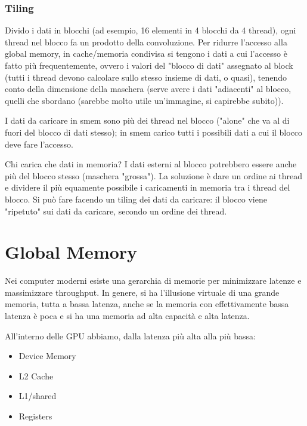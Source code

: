 
\subsubsection{Tiling}
Divido i dati in blocchi (ad esempio, 16 elementi in 4 blocchi da 4 thread), ogni thread nel blocco fa un prodotto della convoluzione. Per ridurre l'accesso alla global memory, in cache/memoria condivisa si tengono i dati a cui l'accesso è fatto più frequentemente, ovvero i valori del "blocco di dati" assegnato al block (tutti i thread devono calcolare sullo stesso insieme di dati, o quasi), tenendo conto della dimensione della maschera (serve avere i dati "adiacenti" al blocco, quelli che sbordano (sarebbe molto utile un'immagine, si capirebbe subito)).

I dati da caricare in smem sono più dei thread nel blocco ("alone" che va al di fuori del blocco di dati stesso); in smem carico tutti i possibili dati a cui il blocco deve fare l'accesso. 

Chi carica che dati in memoria? I dati esterni al blocco potrebbero essere anche più del blocco stesso (maschera "grossa"). La soluzione è dare un ordine ai thread e dividere il più equamente possibile i caricamenti in memoria tra i thread del blocco. Si può fare facendo un tiling dei dati da caricare: il blocco viene "ripetuto" sui dati da caricare, secondo un ordine dei thread.

\section{Global Memory}

Nei computer moderni esiste una gerarchia di memorie per minimizzare latenze e massimizzare throughput. In genere, si ha l'illusione virtuale di una grande memoria, tutta a bassa latenza, anche se la memoria con effettivamente bassa latenza è poca e si ha una memoria ad alta capacità e alta latenza.

All'interno delle GPU abbiamo, dalla latenza più alta alla più bassa: 
\begin{itemize}
	\item Device Memory
	
	\item L2 Cache
	
	\item L1/shared
	
	\item Registers
\end{itemize}

